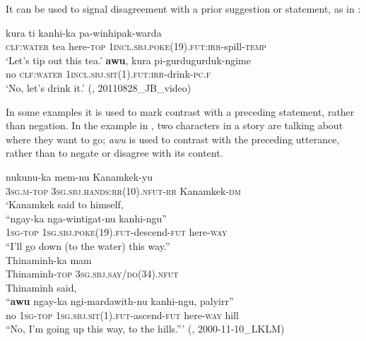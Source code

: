 \documentclass[output=paper,colorlinks,citecolor=brown]{langscibook}
\begin{document}
It can be used to signal disagreement with a prior suggestion or statement, as in :

\ea\label{ex:mur:90}
    \begin{xlist}
    \label{ex:mur:90Q}
        \gll  kura ti kanhi-ka pa-winhipak-warda\\ 
              \textsc{clf:water} tea here-\textsc{top} \textsc{1incl.sbj.poke(19).fut:irr}{}-spill-\textsc{temp}\\ 
        \glt ‘Let’s tip out this tea.’
    \label{ex:mur:90A}
        \gll  \textbf{awu}, kura pi-gurdugurduk-ngime\\ 
               no \textsc{clf:water} \textsc{1incl.sbj.sit(1).fut:irr-}drink\textsc{{}-pc.f}\\
        \glt ‘No, let’s drink it\textsc{.’} (\citealt{MansfieldEtAl2019}, 20110828\_JB\_video)
    \end{xlist}
\z 

In some examples it is used to mark contrast with a preceding statement, rather than negation. In the example in , two characters in a story are talking about where they want to go; \textit{awu} is used to contrast with the preceding utterance, rather than to negate or disagree with its content. 

\ea\label{ex:mur:91}
        \gll  nukunu-ka mem-nu Kanamkek-yu \\ 
              \textsc{3sg.m-top} 3\textsc{sg.sbj.hands:rr(10).nfut-rr} Kanamkek-\textsc{dm} \\ 
        \glt ‘Kanamkek said to himself, 
        \medskip \\ 
        \gll   “ngay-ka nga-wintigat-nu kanhi-ngu”\\ 
             {\db}\textsc{1sg-top} \textsc{1sg.sbj.poke(19).fut}{}-descend-\textsc{fut} here-\textsc{way}\\ 
        \glt “I’ll go down (to the water) this way.”
        \medskip \\ 
        \gll  Thinaminh-ka mam \\ 
              Thinaminh-\textsc{top} \textsc{3sg.sbj.say/do(34).nfut} \\
        \glt Thinaminh said,  \\
        \medskip
        \gll  “\textbf{awu} ngay-ka ngi-mardawith-nu kanhi-ngu, palyirr”\\ 
               {\db}no \textsc{1sg-top} \textsc{1sg.sbj.sit(1).fut}{}-ascend-\textsc{fut} here-\textsc{way} hill\\
        \glt “No, I’m going up this way, to the hills.”’ (\citealt{MansfieldEtAl2019}, 2000-11-10\_LKLM) 
\z 
\end{document}

